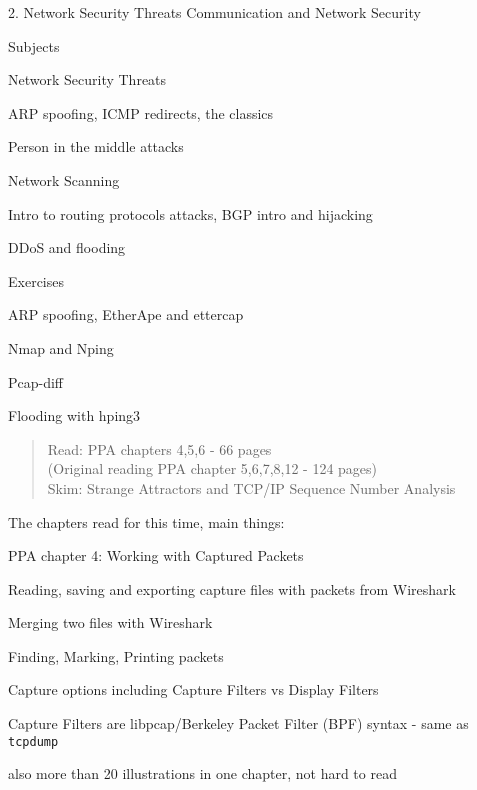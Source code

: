\documentclass[Screen16to9,17pt]{foils}
\begin{document}
\mytitlepage
{2. Network Security Threats}
{Communication and Network Security \the\year}


\begin{list1}
\item Subjects
\begin{list2}
\item Network Security Threats
\item ARP spoofing, ICMP redirects, the classics
\item Person in the middle attacks
\item Network Scanning
\item Intro to routing protocols attacks, BGP intro and hijacking
\item DDoS and flooding
\end{list2}
\item Exercises
\begin{list2}
\item ARP spoofing, EtherApe and ettercap
\item Nmap and Nping
\item Pcap-diff
\item Flooding with hping3
\end{list2}
\end{list1}



\begin{quote}
Read: PPA chapters 4,5,6 - 66 pages\\
(Original reading PPA chapter 5,6,7,8,12 - 124 pages)\\
Skim: Strange Attractors and TCP/IP Sequence Number Analysis
\end{quote}

\begin{list1}
\item The chapters read for this time, main things:
\item PPA chapter 4: Working with Captured Packets
\begin{list2}
\item Reading, saving and exporting capture files with packets from Wireshark
\item Merging two files with Wireshark
\item Finding, Marking, Printing packets
\item Capture options including Capture Filters vs Display Filters
\item Capture Filters are libpcap/Berkeley Packet
Filter (BPF) syntax - same as \verb+tcpdump+
\end{list2}
\item also more than 20 illustrations in one chapter, not hard to read
\end{list1}
\end{document}
